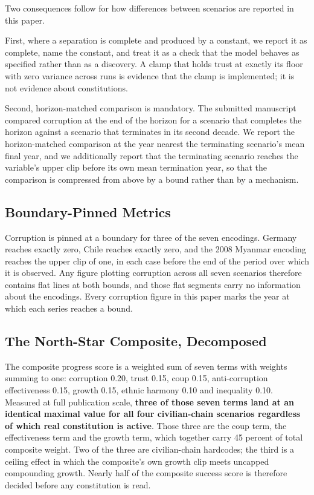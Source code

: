 \documentclass{ieeeaccess}
\newif\ifpendingvisible
\newcommand{\todo}[1]{%
  \ifpendingvisible\textcolor{red}{\textbf{[\MakeUppercase{#1}]}}\fi}
\begin{document}
Two consequences follow for how differences between scenarios are
reported in this paper.

First, where a separation is complete and produced by a constant, we
report it as complete, name the constant, and treat it as a check that
the model behaves as specified rather than as a discovery. A clamp that
holds trust at exactly its floor with zero variance across runs is
evidence that the clamp is implemented; it is not evidence about
constitutions.

Second, horizon-matched comparison is mandatory. The submitted
manuscript compared corruption at the end of the horizon for a scenario
that completes the horizon against a scenario that terminates in its
second decade. We report the horizon-matched comparison at the year
nearest the terminating scenario's mean final year, and we additionally
report that the terminating scenario reaches the variable's upper clip
before its own mean termination year, so that the comparison is
compressed from above by a bound rather than by a mechanism.
\todo{PENDING CAMPAIGN: horizon-matched corruption comparison at the
campaign $N$, with the clip year stated for each scenario.}

\subsection{Boundary-Pinned Metrics}
Corruption is pinned at a boundary for three of the seven encodings.
Germany reaches exactly zero, Chile reaches exactly zero, and the 2008
Myanmar encoding reaches the upper clip of one, in each case before the
end of the period over which it is observed. Any figure plotting
corruption across all seven scenarios therefore contains flat lines at
both bounds, and those flat segments carry no information about the
encodings. Every corruption figure in this paper marks the year at which
each series reaches a bound.
\todo{PENDING CAMPAIGN: the bound-arrival year for each of the seven
series at the campaign $N$.}

\subsection{The North-Star Composite, Decomposed}
The composite progress score is a weighted sum of seven terms with
weights summing to one: corruption 0.20, trust 0.15, coup 0.15,
anti-corruption effectiveness 0.15, growth 0.15, ethnic harmony 0.10 and
inequality 0.10. Measured at full publication scale, \textbf{three of
those seven terms land at an identical maximal value for all four
civilian-chain scenarios regardless of which real constitution is
active}. Those three are the coup term, the effectiveness term and the
growth term, which together carry 45 percent of total composite weight.
Two of the three are civilian-chain hardcodes; the third is a ceiling
effect in which the composite's own growth clip meets uncapped
compounding growth. Nearly half of the composite success score is
therefore decided before any constitution is read.
\end{document}
